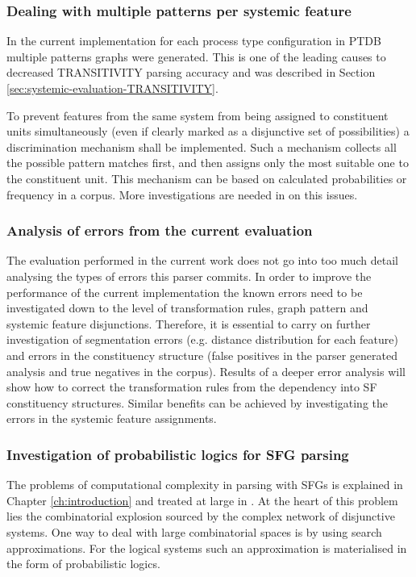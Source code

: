 \subsubsection{Dealing with multiple patterns per systemic feature}    

    In the current implementation for each process type configuration in PTDB multiple patterns graphs were generated. This is one of the leading causes to decreased TRANSITIVITY parsing accuracy and was described in Section \ref{sec:systemic-evaluation-TRANSITIVITY}.
    
    To prevent features from the same system from being assigned to constituent units simultaneously (even if clearly marked as a disjunctive set of possibilities) a discrimination mechanism shall be implemented. Such a mechanism collects all the possible pattern matches first, and then assigns only the most suitable one to the constituent unit. This mechanism can be based on calculated probabilities or frequency in a corpus. More investigations are needed in on this issues. 

\subsubsection{Analysis of errors from the current evaluation}     
    
    The evaluation performed in the current work does not go into too much detail analysing the types of errors this parser commits. In order to improve the performance of the current implementation the known errors need to be investigated down to the level of transformation rules, graph pattern and systemic feature disjunctions. Therefore, it is essential to carry on further investigation of segmentation errors (e.g. distance distribution for each feature) and errors in the constituency structure (false positives in the parser generated analysis and true negatives in the corpus). Results of a deeper error analysis will show how to correct the transformation rules from the dependency into SF constituency structures. Similar benefits can be achieved by investigating the errors in the systemic feature assignments.

\subsubsection{Investigation of probabilistic logics for SFG parsing}
    
    The problems of computational complexity in parsing with SFGs is explained in Chapter \ref{ch:introduction} and treated at large in \citet{Bateman2008}. At the heart of this problem lies the combinatorial explosion sourced by the complex network of disjunctive systems. One way to deal with large combinatorial spaces is by using search approximations. For the logical systems such an approximation is materialised in the form of probabilistic logics.
    
